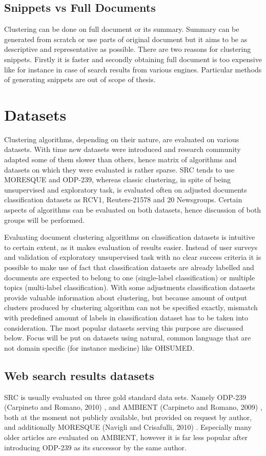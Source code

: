 \documentclass[a4paper, 12pt, oneside]{Thesis} %
\begin{document}
\section{Snippets vs Full Documents} Clustering can be done on full document or its summary. Summary can be generated from scratch or use parts of original document but it aims to be as descriptive and representative as possible. There are two reasons for clustering snippets. Firstly it is faster and secondly obtaining full document is too expensive like for instance in case of search results from various engines. Particular methods of generating snippets are out of scope of thesis.

\chapter{Datasets} Clustering algorithms, depending on their nature, are evaluated on various datasets. With time new datasets were introduced and research community adapted some of them slower than others, hence matrix of algorithms and datasets on which they were evaluated is rather sparse. SRC tends to use MORESQUE and ODP-239, whereas classic clustering, in spite of being unsupervised and exploratory task, is evaluated often on adjusted documents classification datasets as RCV1, Reuters-21578 and 20 Newsgroups. Certain aspects of algorithms can be evaluated on both datasets, hence discussion of both groups will be performed. 

Evaluating document clustering algorithms on classification datasets is intuitive to certain extent, as it makes evaluation of results easier. Instead of user surveys and validation of exploratory unsupervised task with no clear success criteria it is possible to make use of fact that classification datasets are already labelled and documents are expected to belong to one (single-label classification) or multiple topics (multi-label classification). With some adjustments classification datasets provide valuable information about clustering, but because amount of output clusters produced by clustering algorithm can not be specified exactly, mismatch with predefined amount of labels in classification dataset has to be taken into consideration. The most popular datasets serving this purpose are discussed below. Focus will be put on datasets using natural, common language that are not domain specific (for instance medicine) like OHSUMED.

\section{Web search results datasets} SRC is usually evaluated on three gold standard data sets. Namely ODP-239 (Carpineto and Romano, 2010) \cite{carpineto2010new}, and AMBIENT (Carpineto and Romano, 2009) \cite{bernardini2009full}, both at the moment not publicly available, but provided on request by author, and additionally MORESQUE (Navigli and Crisafulli, 2010) \cite{navigli2010inducing}. Especially many older articles are evaluated on AMBIENT, however it is far less popular after introducing ODP-239 as its successor by the same author.
\end{document}
